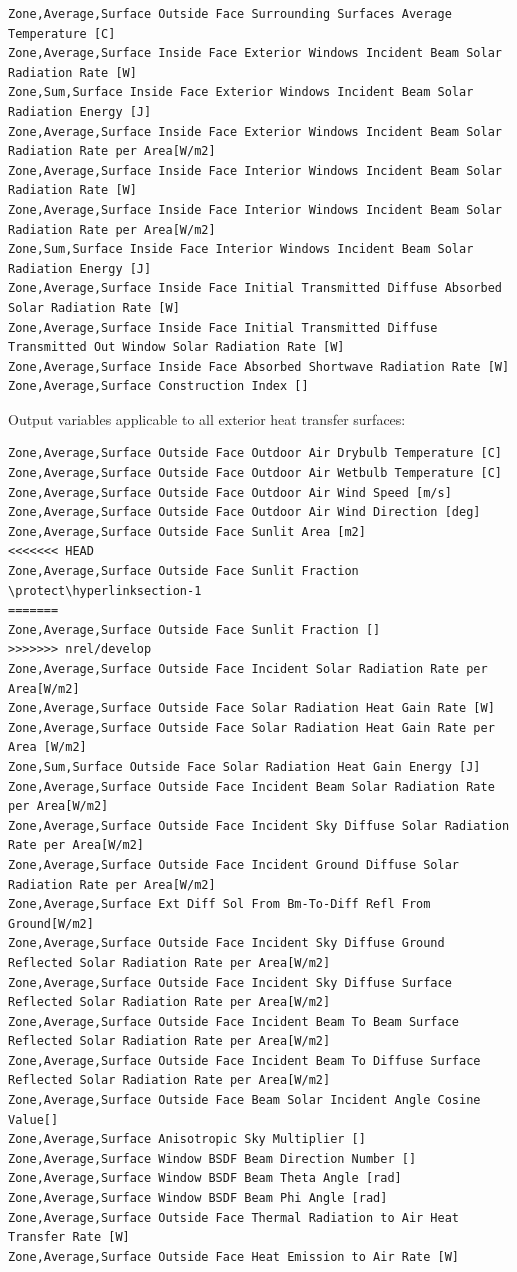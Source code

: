 \begin{lstlisting}
Zone,Average,Surface Outside Face Surrounding Surfaces Average Temperature [C]
Zone,Average,Surface Inside Face Exterior Windows Incident Beam Solar Radiation Rate [W]
Zone,Sum,Surface Inside Face Exterior Windows Incident Beam Solar Radiation Energy [J]
Zone,Average,Surface Inside Face Exterior Windows Incident Beam Solar Radiation Rate per Area[W/m2]
Zone,Average,Surface Inside Face Interior Windows Incident Beam Solar Radiation Rate [W]
Zone,Average,Surface Inside Face Interior Windows Incident Beam Solar Radiation Rate per Area[W/m2]
Zone,Sum,Surface Inside Face Interior Windows Incident Beam Solar Radiation Energy [J]
Zone,Average,Surface Inside Face Initial Transmitted Diffuse Absorbed Solar Radiation Rate [W]
Zone,Average,Surface Inside Face Initial Transmitted Diffuse Transmitted Out Window Solar Radiation Rate [W]
Zone,Average,Surface Inside Face Absorbed Shortwave Radiation Rate [W]
Zone,Average,Surface Construction Index []
\end{lstlisting}

Output variables applicable to all exterior heat transfer surfaces:

\begin{lstlisting}
Zone,Average,Surface Outside Face Outdoor Air Drybulb Temperature [C]
Zone,Average,Surface Outside Face Outdoor Air Wetbulb Temperature [C]
Zone,Average,Surface Outside Face Outdoor Air Wind Speed [m/s]
Zone,Average,Surface Outside Face Outdoor Air Wind Direction [deg]
Zone,Average,Surface Outside Face Sunlit Area [m2]
<<<<<<< HEAD
Zone,Average,Surface Outside Face Sunlit Fraction \protect\hyperlinksection-1
=======
Zone,Average,Surface Outside Face Sunlit Fraction []
>>>>>>> nrel/develop
Zone,Average,Surface Outside Face Incident Solar Radiation Rate per Area[W/m2]
Zone,Average,Surface Outside Face Solar Radiation Heat Gain Rate [W]
Zone,Average,Surface Outside Face Solar Radiation Heat Gain Rate per Area [W/m2]
Zone,Sum,Surface Outside Face Solar Radiation Heat Gain Energy [J]
Zone,Average,Surface Outside Face Incident Beam Solar Radiation Rate per Area[W/m2]
Zone,Average,Surface Outside Face Incident Sky Diffuse Solar Radiation Rate per Area[W/m2]
Zone,Average,Surface Outside Face Incident Ground Diffuse Solar Radiation Rate per Area[W/m2]
Zone,Average,Surface Ext Diff Sol From Bm-To-Diff Refl From Ground[W/m2]
Zone,Average,Surface Outside Face Incident Sky Diffuse Ground Reflected Solar Radiation Rate per Area[W/m2]
Zone,Average,Surface Outside Face Incident Sky Diffuse Surface Reflected Solar Radiation Rate per Area[W/m2]
Zone,Average,Surface Outside Face Incident Beam To Beam Surface Reflected Solar Radiation Rate per Area[W/m2]
Zone,Average,Surface Outside Face Incident Beam To Diffuse Surface Reflected Solar Radiation Rate per Area[W/m2]
Zone,Average,Surface Outside Face Beam Solar Incident Angle Cosine Value[]
Zone,Average,Surface Anisotropic Sky Multiplier []
Zone,Average,Surface Window BSDF Beam Direction Number []
Zone,Average,Surface Window BSDF Beam Theta Angle [rad]
Zone,Average,Surface Window BSDF Beam Phi Angle [rad]
Zone,Average,Surface Outside Face Thermal Radiation to Air Heat Transfer Rate [W]
Zone,Average,Surface Outside Face Heat Emission to Air Rate [W]
\end{lstlisting}

